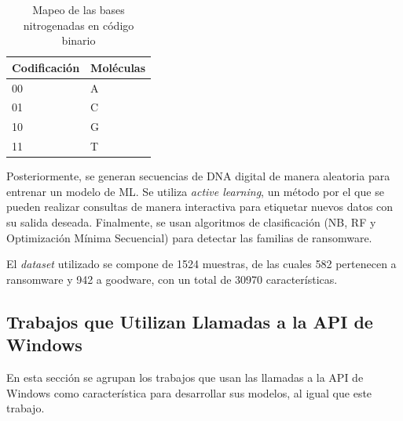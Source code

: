 \begin{table}[htb!]
    \centering
    \scriptsize %
    \caption{Mapeo de las bases nitrogenadas en código binario}
    \begin{tabular}{|m{3cm} | m{3cm}|}
        \hline
        \rowcolor[HTML]{C0C0C0} 
        \textbf{Codificación} & \textbf{Moléculas}\\ \hline
        00 & A\\ \hline
        01 & C \\ \hline
        10 & G\\ \hline
        11 & T\\ \hline
    \end{tabular}
    \label{tab:moleculas}
\end{table}

Posteriormente, se generan secuencias de \gls{DNA} digital de manera aleatoria para entrenar un modelo de \gls{ML}. Se utiliza \textit{active learning}, un método por el que se pueden realizar consultas de manera interactiva para etiquetar nuevos datos con su salida deseada. Finalmente, se usan algoritmos de clasificación (\gls{NB}, \gls{RF} y Optimización Mínima Secuencial) para detectar las familias de ransomware. 

El \textit{dataset} utilizado se compone de 1524 muestras, de las cuales 582 pertenecen a ransomware y 942 a goodware, con un total de 30970 características.

\subsection{Trabajos que Utilizan Llamadas a la API de Windows}

\noindent En esta sección se agrupan los trabajos que usan las llamadas a la \gls{API} de Windows como característica para desarrollar sus modelos, al igual que este trabajo.

